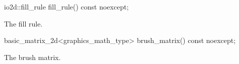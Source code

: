 %
\begin{itemdecl}
io2d::fill_rule fill_rule() const noexcept;
\end{itemdecl}
\begin{itemdescr}
\pnum
\returns
The fill rule.
\end{itemdescr}

%
\begin{itemdecl}
basic_matrix_2d<graphics_math_type> brush_matrix() const noexcept;
\end{itemdecl}
\begin{itemdescr}
\pnum
\returns
The brush matrix.
\end{itemdescr}
